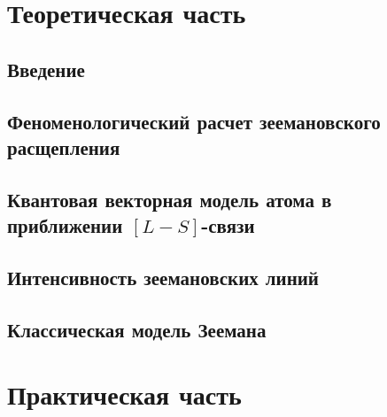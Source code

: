 



\def\labauthors{}
\def\labgroup{430}
\def\labnumber{2}
\def\labtheme{Эффект Зеемана}
\renewcommand{\vec}{\mathbf}
\renewcommand{\Re}{\operatorname{Re}}
\renewcommand{\Im}{\operatorname{Im}}
\renewcommand{\phi}{\varphi}
\renewcommand{\hat}{\widehat}



\tableofcontents
\newpage
\section{Теоретическая часть}
\subsection{Введение}

\subsection{Феноменологический расчет зеемановского расщепления}

\subsection{Квантовая векторная модель атома в приближении $[L-S]$-связи}

\subsection{Интенсивность зеемановских линий}

\subsection{Классическая модель Зеемана}

\section{Практическая часть}



